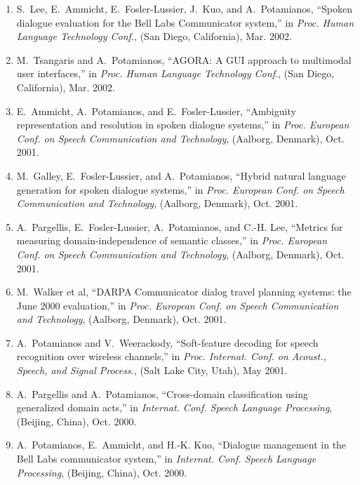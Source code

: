 \begin{enumerate}
\item
S.~Lee, E.~Ammicht, E.~Fosler-Lussier, J.~Kuo, and A.~Potamianos, ``Spoken
  dialogue evaluation for the {B}ell {L}abs {C}ommunicator system,'' in {\em
  Proc. Human Language Technology Conf.}, (San Diego, California), Mar. 2002.

\item
M.~Tsangaris and A.~Potamianos, ``{AGORA}: A {GUI} approach to multimodal user
  interfaces,'' in {\em Proc. Human Language Technology Conf.}, (San Diego,
  California), Mar. 2002.

\item
E.~Ammicht, A.~Potamianos, and E.~Fosler-Lussier, ``Ambiguity representation
  and resolution in spoken dialogue systems,'' in {\em Proc. European Conf. on
  Speech Communication and Technology}, (Aalborg, Denmark), Oct. 2001.

\item
M.~Galley, E.~Fosler-Lussier, and A.~Potamianos, ``Hybrid natural language
  generation for spoken dialogue systems,'' in {\em Proc. European Conf. on
  Speech Communication and Technology}, (Aalborg, Denmark), Oct. 2001.

\item
A.~Pargellis, E.~Fosler-Lussier, A.~Potamianos, and C.-H. Lee, ``Metrics for
  measuring domain-independence of semantic classes,'' in {\em Proc. European
  Conf. on Speech Communication and Technology}, (Aalborg, Denmark), Oct. 2001.

\item
M.~{Walker et al}, ``{DARPA} {C}ommunicator dialog travel planning systems: the
  {J}une 2000 evaluation,'' in {\em Proc. European Conf. on Speech
  Communication and Technology}, (Aalborg, Denmark), Oct. 2001.

\item
A.~Potamianos and V.~Weerackody, ``Soft-feature decoding for speech recognition
  over wireless channels,'' in {\em Proc. Internat. Conf. on Acoust., Speech,
  and Signal Process.}, (Salt Lake City, Utah), May 2001.

\item
A.~Pargellis and A.~Potamianos, ``Cross-domain classification using generalized
  domain acts,'' in {\em Internat. Conf. Speech Language Processing}, (Beijing,
  China), Oct. 2000.

\item
A.~Potamianos, E.~Ammicht, and H.-K. Kuo, ``Dialogue management in the {B}ell
  {L}abs communicator system,'' in {\em Internat. Conf. Speech Language
  Processing}, (Beijing, China), Oct. 2000.


\end{enumerate}

